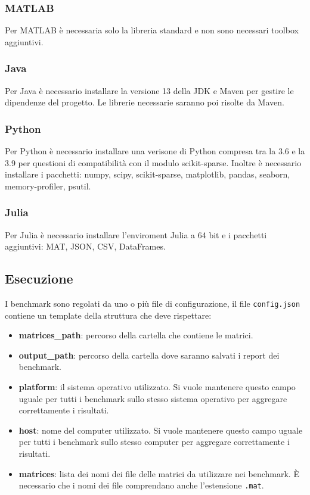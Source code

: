 \documentclass[a4paper, 12pt]{article}
\begin{document}
\subsubsection{MATLAB}
Per MATLAB è necessaria solo la libreria standard e non sono necessari toolbox
aggiuntivi.
\subsubsection{Java}
Per Java è necessario installare la versione 13 della JDK e Maven per gestire le
dipendenze del progetto. Le librerie necessarie saranno poi risolte da Maven.
\subsubsection{Python}
Per Python è necessario installare una verisone di Python compresa tra la 3.6 e
la 3.9 per questioni di compatibilità con il modulo scikit-sparse.
Inoltre è necessario installare i pacchetti: numpy, scipy, scikit-sparse,
matplotlib, pandas, seaborn, memory-profiler, psutil.
\subsubsection{Julia}
Per Julia è necessario installare l'enviroment Julia a 64 bit e i pacchetti
aggiuntivi: MAT, JSON, CSV, DataFrames.

\subsection{Esecuzione}
I benchmark sono regolati da uno o più file di configurazione, il file
\texttt{config.json} contiene un template della struttura che deve rispettare:
\begin{itemize}
  \item \textbf{matrices\_path}: percorso della cartella che contiene le
  matrici.
  \item \textbf{output\_path}: percorso della cartella dove saranno salvati i
  report dei benchmark.
  \item \textbf{platform}: il sistema operativo utilizzato.
  Si vuole mantenere questo campo uguale per tutti i benchmark sullo stesso
  sistema operativo per aggregare correttamente i risultati.
  \item \textbf{host}: nome del computer utilizzato.
  Si vuole mantenere questo campo uguale per tutti i benchmark sullo stesso
  computer per aggregare correttamente i risultati.
  \item \textbf{matrices}: lista dei nomi dei file delle matrici da utilizzare
  nei benchmark. \`E necessario che i nomi dei file comprendano anche
  l'estensione \texttt{.mat}.
\end{itemize}
\end{document}
